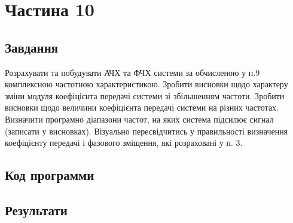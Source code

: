 \section{Частина 10}
\label{sec:task10}

\subsection{Завдання}
\label{subsec:task10_task}

Розрахувати та побудувати АЧХ та ФЧХ системи за обчисленою у п.9
комплексною частотною характеристикою. Зробити висновки щодо
характеру зміни модуля коефіцієнта передачі системи зі збільшенням частоти.
Зробити висновки щодо величини коефіцієнта передачі системи на різних
частотах. Визначити програмно діапазони частот, на яких система підсилює
сигнал (записати у висновках). Візуально пересвідчитись у правильності
визначення коефіцієнту передачі і фазового зміщення, які розраховані у п. 3.

\subsection{Код программи}
\label{subsec:task10_code}

\subsection{Результати}
\label{subsec:task10_results}
